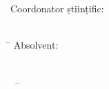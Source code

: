 %

\begin{center}
	\begin{vminipage}{\textwidth}
    	\centering
		{\Large \xthesisuniversity}
    	{\Large \xthesisfaculty}
		{\Large \xthesissdomain}
	\end{vminipage}
  	{\ \vspace{4.1cm}}
	\begin{vminipage}[t][3.1cm][s]{\textwidth}%
		\centering
		\vfill
		{\HUGE\bfseries\xthesistitle}\\
		\bigskip
		{\huge\bfseries\xthesissubtitle}
		\vfill
	\end{vminipage}
	\vspace{1.7cm}

	{\LARGE \xthesistype}
	\vfill

	\begin{minipage}[t][1.6cm][t]{.95\textwidth}%
		\begin{flushleft}
	 	 	\Large
	  		Coordonator științific: \\
	  		\xthesisadvisor \\
  		\end{flushleft}
	\end{minipage}

	\vspace{0.5cm}

	\begin{minipage}[t][1.6cm][t]{.95\textwidth}%
		\Large
		\begin{tabbing}%
			\hspace{12cm} \= \hspace{4cm} \kill	
			\> Absolvent: \\
			\> \xthesisauthor \\   
		\end{tabbing}
	\end{minipage}

	\vspace{2.5cm}

	\begin{minipage}[b]{\textwidth}%
		\centering
		  \large
		\xthesiscity \, \--- \xthesisyear %
	\end{minipage}

\end{center}

\cleardoublepage
